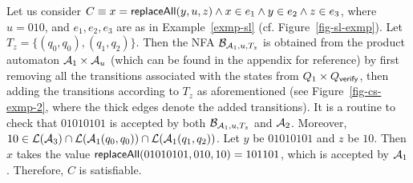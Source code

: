 \begin{example}\label{exmp-cs-case}
Let us consider $C \equiv x = \mathsf{replaceAll}(y, u, z) \wedge x \in e_1 \wedge y \in e_2 \wedge z \in e_3$, where $u = 010$, and $e_1,e_2,e_3$ are as in Example~\ref{exmp-sl} (cf. Figure~\ref{fig-sl-exmp}). 
Let $T_z = \{(q_0,q_0),(q_1,q_2)\}$. Then the NFA $\mathcal{B}_{\mathcal{A}_1, u, T_z}$ is obtained from the product automaton $\mathcal{A}_1 \times \mathcal{A}_u$ (which can be found in the appendix for reference) by first removing all the transitions  associated with the states from $Q_1 \times Q_{\mathsf{verify}}$, then adding the transitions according to $T_z$ as aforementioned (see Figure~\ref{fig-cs-exmp-2}, where the thick edges denote the added transitions).  It is a routine to check that $01010101$ is accepted by both $\mathcal{B}_{\mathcal{A}_1, u, T_z}$ and $\mathcal{A}_2$. Moreover, $10 \in \mathcal{L}(\mathcal{A}_3) \cap \mathcal{L}(\mathcal{A}_1(q_0,q_0)) \cap \mathcal{L}(\mathcal{A}_1(q_1,q_2))$. Let $y$ be $01010101$ and $z$ be $10$. Then $x$ takes the value $\mathsf{replaceAll}(01010101, 010, 10)=101101$, which is accepted by $\mathcal{A}_1$. Therefore, $C$ is satisfiable.
%
\begin{figure}[htbp]
\begin{center}

\end{center}
\end{figure}
\end{example}
